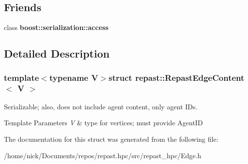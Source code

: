 \subsection*{Friends}
\begin{DoxyCompactItemize}
\item 
\hypertarget{structrepast_1_1_repast_edge_content_ac98d07dd8f7b70e16ccb9a01abf56b9c}{class {\bfseries boost\-::serialization\-::access}}\label{structrepast_1_1_repast_edge_content_ac98d07dd8f7b70e16ccb9a01abf56b9c}

\end{DoxyCompactItemize}


\subsection{Detailed Description}
\subsubsection*{template$<$typename V$>$struct repast\-::\-Repast\-Edge\-Content$<$ V $>$}

Serializable; also, does not include agent content, only agent I\-Ds. 


\begin{DoxyTemplParams}{Template Parameters}
{\em V} & type for vertices; must provide Agent\-I\-D \\
\hline
\end{DoxyTemplParams}


The documentation for this struct was generated from the following file\-:\begin{DoxyCompactItemize}
\item 
/home/nick/\-Documents/repos/repast.\-hpc/src/repast\-\_\-hpc/Edge.\-h\end{DoxyCompactItemize}
